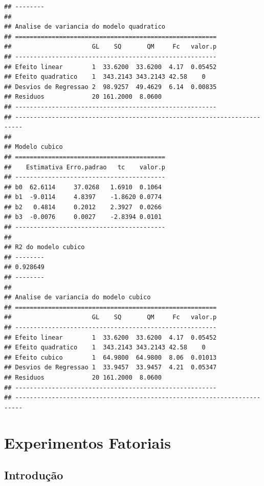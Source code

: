 \documentclass[
]{book}
\begin{document}
\begin{verbatim}
## --------
## 
## Analise de variancia do modelo quadratico
## =======================================================
##                      GL    SQ       QM     Fc   valor.p
## -------------------------------------------------------
## Efeito linear        1  33.6200  33.6200  4.17  0.05452
## Efeito quadratico    1  343.2143 343.2143 42.58    0   
## Desvios de Regressao 2  98.9257  49.4629  6.14  0.00835
## Residuos             20 161.2000  8.0600               
## -------------------------------------------------------
## ------------------------------------------------------------------------
## 
## Modelo cubico
## =========================================
##    Estimativa Erro.padrao   tc    valor.p
## -----------------------------------------
## b0  62.6114     37.0268   1.6910  0.1064 
## b1  -9.0114     4.8397    -1.8620 0.0774 
## b2   0.4814     0.2012    2.3927  0.0266 
## b3  -0.0076     0.0027    -2.8394 0.0101 
## -----------------------------------------
## 
## R2 do modelo cubico
## --------
## 0.928649
## --------
## 
## Analise de variancia do modelo cubico
## =======================================================
##                      GL    SQ       QM     Fc   valor.p
## -------------------------------------------------------
## Efeito linear        1  33.6200  33.6200  4.17  0.05452
## Efeito quadratico    1  343.2143 343.2143 42.58    0   
## Efeito cubico        1  64.9800  64.9800  8.06  0.01013
## Desvios de Regressao 1  33.9457  33.9457  4.21  0.05347
## Residuos             20 161.2000  8.0600               
## -------------------------------------------------------
## ------------------------------------------------------------------------
\end{verbatim}

\chapter{Experimentos Fatoriais}\label{experimentos-fatoriais}

\section{Introdução}\label{introduuxe7uxe3o-3}
\end{document}
